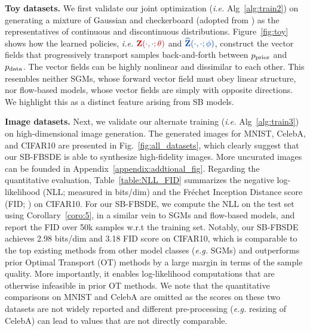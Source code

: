 \documentclass{article}
\def\rvZ{{\mathbf{Z}}}
\newcommand{\pdata}{p_{\rm{data}}}
\newcommand{\eg}{{\ignorespaces\emph{e.g.}}{ }}
\newcommand{\ie}{{\ignorespaces\emph{i.e.}}{ }}
\begin{document}
\textbf{Toy datasets.}
We first validate our joint optimization (\ie Alg~\ref{alg:train2}) on generating a mixture of Gaussian and checkerboard (adopted from \citet{grathwohl2018ffjord})
as the representatives of continuous and discontinuous distributions.
Figure~\ref{fig:toy}
shows how the learned policies, \ie $\color{color3} {\rvZ}(\cdot,\cdot;\theta)$ and $\color{color5} \widehat{\rvZ}(\cdot,\cdot;\phi)$,
construct the vector fields that progressively transport
samples back-and-forth between ${ p_\text{\normalfont{prior}} }$ and $\pdata$.
The vector fields can be highly nonlinear and dissimilar to each other.
This resembles neither SGMs, whose forward vector field must obey linear structure,
nor flow-based models, whose vector fields are simply with opposite directions.
We highlight this as a distinct feature arising from SB models.



\textbf{Image datasets.}
Next, we validate our alternate training (\ie Alg~\ref{alg:train3}) on high-dimensional image generation.
The generated images for MNIST, CelebA, and CIFAR10 are presented in Fig.~\ref{fig:all_datasets},
which clearly suggest that our SB-FBSDE is able to synthesize high-fidelity images.
More uncurated images can be founded in Appendix~\ref{appendix:addtional_fig}.
Regarding the quantitative evaluation, Table~\ref{table:NLL_FID} summarizes
the negative log-likelihood (NLL; measured in bits/dim) and the
Fr\'echet Inception Distance score (FID; \citet{heusel2017gans}) on CIFAR10.
For our SB-FBSDE, we compute the NLL on the test set using Corollary~\ref{coro:5},
in a similar vein to SGMs and flow-based models,
and report the FID over 50k samples w.r.t the training set.
Notably, our SB-FBSDE achieves 2.98 bits/dim and 3.18 FID score on CIFAR10,
which is comparable to the top existing methods from other model classes (\eg SGMs) and
outperforms prior Optimal Transport (OT) methods \citep{wang2021deep,tanaka2019discriminator}
by a large margin in terms of the sample quality.
More importantly, it enables log-likelihood computations that are otherwise infeasible in prior OT methods.
We note that the quantitative comparisons on MNIST and CelebA are omitted
as the scores on these two datasets are not widely reported and different pre-processing (\eg resizing of CelebA) can lead to values that are not directly comparable.
\end{document}
